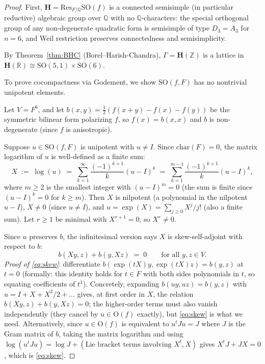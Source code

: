 \documentclass[12pt]{article}
\theoremstyle{definition}
\begin{document}
\begin{proof}
First, $\mathbf{H}=\mathrm{Res}_{F/\mathbb{Q}}\mathrm{SO}(f)$ is a connected semisimple (in particular reductive) algebraic group over $\mathbb{Q}$ with no $\mathbb{Q}$-characters: the special orthogonal group of any non-degenerate quadratic form is semisimple of type $D_3=A_3$ for $n=6$, and Weil restriction preserves connectedness and semisimplicity.

By Theorem~\ref{thm:BHC} (Borel--Harish-Chandra), $\Gamma=\mathbf{H}(\mathbb{Z})$ is a lattice in $\mathbf{H}(\mathbb{R})\cong\mathrm{SO}(5,1)\times\mathrm{SO}(6)$.

To prove cocompactness via Godement, we show $\mathrm{SO}(f,F)$ has no nontrivial unipotent elements.

Let $V=F^6$, and let $b(x,y)=\tfrac12(f(x+y)-f(x)-f(y))$ be the symmetric bilinear form polarizing $f$, so $f(x)=b(x,x)$ and $b$ is non-degenerate (since $f$ is anisotropic).

Suppose $u\in\mathrm{SO}(f,F)$ is unipotent with $u\neq I$. Since $\mathrm{char}(F)=0$, the matrix logarithm of $u$ is well-defined as a finite sum:
\[
X \;:=\; \log(u) \;=\; \sum_{k=1}^{\infty}\frac{(-1)^{k+1}}{k}(u-I)^k \;=\; \sum_{k=1}^{m-1}\frac{(-1)^{k+1}}{k}(u-I)^k,
\]
where $m\geq 2$ is the smallest integer with $(u-I)^m=0$ (the sum is finite since $(u-I)^k=0$ for $k\geq m$). Then $X$ is nilpotent (a polynomial in the nilpotent $u-I$), $X\neq 0$ (since $u\neq I$), and $u=\exp(X)=\sum_{j\geq 0}X^j/j!$ (also a finite sum). Let $r\geq 1$ be minimal with $X^{r+1}=0$, so $X^r\neq 0$.

Since $u$ preserves $b$, the infinitesimal version says $X$ is skew-self-adjoint with respect to $b$:
\begin{equation}\label{eq:skew}
b(Xy, z) + b(y, Xz) \;=\; 0\qquad\text{for all }y,z\in V.
\end{equation}
\emph{Proof of \eqref{eq:skew}}: differentiate $b(\exp(tX)y,\exp(tX)z)=b(y,z)$ at $t=0$ (formally: this identity holds for $t\in F$ with both sides polynomials in $t$, so equating coefficients of $t^1$). Concretely, expanding $b(uy,uz)=b(y,z)$ with $u=I+X+X^2/2+\dots$ gives, at first order in $X$, the relation $b(Xy,z)+b(y,Xz)=0$; the higher-order terms must also vanish independently (they cancel by $u\in\mathrm{O}(f)$ exactly), but \eqref{eq:skew} is what we need. Alternatively, since $u\in\mathrm{O}(f)$ is equivalent to $u^t J u=J$ where $J$ is the Gram matrix of $b$, taking the matrix logarithm and using $\log(u^tJu)=\log J + (\text{Lie bracket terms involving }X^t,X)$ gives $X^tJ+JX=0$, which is \eqref{eq:skew}.


\end{proof}
\end{document}
